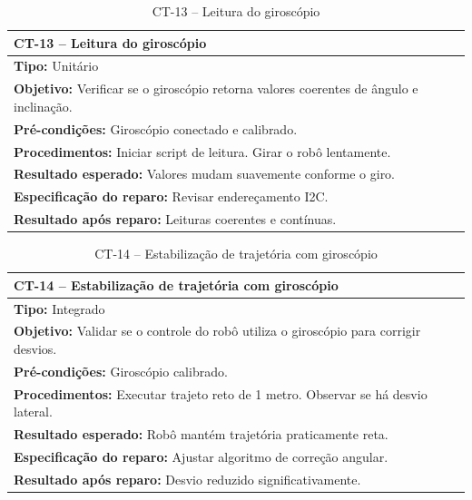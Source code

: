 
\begin{table}[H]
\centering
\begin{tabular}{|p{}|}
\hline
\textbf{CT-13 – Leitura do giroscópio} \\ \hline
\textbf{Tipo:} Unitário \\ \hline
\textbf{Objetivo:} Verificar se o giroscópio retorna valores coerentes de ângulo e inclinação. \\ \hline
\textbf{Pré-condições:} Giroscópio conectado e calibrado. \\ \hline
\textbf{Procedimentos:} Iniciar script de leitura. Girar o robô lentamente. \\ \hline
\textbf{Resultado esperado:} Valores mudam suavemente conforme o giro. \\ \hline
\textbf{Especificação do reparo:} Revisar endereçamento I2C. \\ \hline
\textbf{Resultado após reparo:} Leituras coerentes e contínuas. \\ \hline
\end{tabular}
\caption{CT-13 – Leitura do giroscópio}
\end{table}


\begin{table}[H]
\centering
\begin{tabular}{|p{}|}
\hline
\textbf{CT-14 – Estabilização de trajetória com giroscópio} \\ \hline
\textbf{Tipo:} Integrado \\ \hline
\textbf{Objetivo:} Validar se o controle do robô utiliza o giroscópio para corrigir desvios. \\ \hline
\textbf{Pré-condições:} Giroscópio calibrado. \\ \hline
\textbf{Procedimentos:} Executar trajeto reto de 1 metro. Observar se há desvio lateral. \\ \hline
\textbf{Resultado esperado:} Robô mantém trajetória praticamente reta. \\ \hline
\textbf{Especificação do reparo:} Ajustar algoritmo de correção angular. \\ \hline
\textbf{Resultado após reparo:} Desvio reduzido significativamente. \\ \hline
\end{tabular}
\caption{CT-14 – Estabilização de trajetória com giroscópio}
\end{table}

